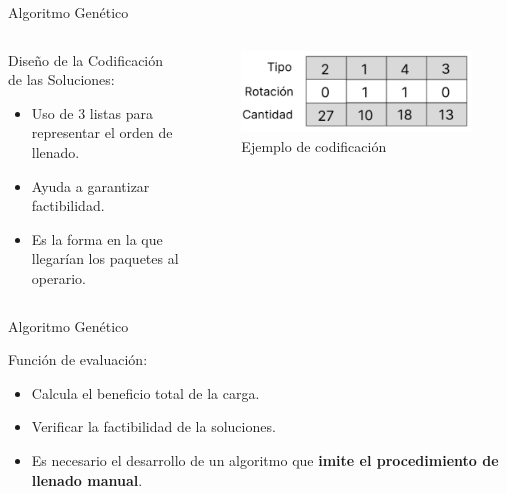 \documentclass[handout]{beamer}
\begin{document}
\begin{frame}{Algoritmo Genético}
    \begin{columns}
        \begin{column}{0.6\textwidth}
            \begin{exampleblock}{Diseño de la Codificación de las Soluciones:}
                \begin{itemize}[<+-| alert@+>]
                    \item Uso de 3 listas para representar el orden de llenado.
                    \item Ayuda a garantizar factibilidad.
                    \item Es la forma en la que llegarían los paquetes al operario.
                \end{itemize}
            \end{exampleblock}
        \end{column}
        \begin{column}{0.4\textwidth}
            \begin{figure}
                \centering
                \includegraphics[width=1\textwidth]{pic/codificacion.png}
                \caption*{Ejemplo de codificación}
                \label{fig:codificacion}
            \end{figure}
        \end{column}
    \end{columns}
\end{frame}

\begin{frame}{Algoritmo Genético}
    \begin{exampleblock}{Función de evaluación:}
        \begin{itemize}[<+-| alert@+>]
            \item Calcula el beneficio total de la carga.
            \item Verificar la factibilidad de la soluciones.
            \item Es necesario el desarrollo de un algoritmo que \textbf{imite el procedimiento de llenado manual}.
        \end{itemize}
    \end{exampleblock}
\end{frame}
\end{document}

